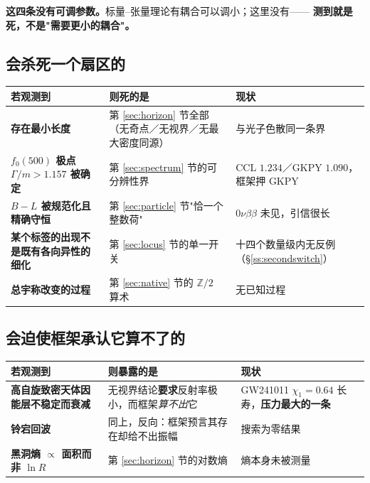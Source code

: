 \documentclass[11pt,a4paper]{article}
\theoremstyle{sudef}
\begin{document}
\textbf{这四条没有可调参数。}标量--张量理论有耦合可以调小；这里没有——
\textbf{测到就是死，不是"需要更小的耦合"。}

\subsection{会杀死一个扇区的}

\begin{center}
\begin{tabular}{p{}p{}p{}}
\toprule
若观测到 & 则死的是 & 现状 \\
\midrule
\textbf{存在最小长度} & 第 \ref{sec:horizon} 节全部（无奇点／无视界／无最大密度同源） & 与光子色散同一条界 \\
\textbf{$f_0(500)$ 极点 $\Gamma/m>1.157$ 被确定} & 第 \ref{sec:spectrum} 节的可分辨性界 & CCL $1.234$／GKPY $1.090$，框架押 GKPY \\
\textbf{$B-L$ 被规范化且精确守恒} & 第 \ref{sec:particle} 节"恰一个整数荷" & $0\nu\beta\beta$ 未见，引信很长 \\
\textbf{某个标签的出现不是既有各向异性的细化} & 第 \ref{sec:locus} 节的单一开关 & 十四个数量级内无反例（\S\ref{ss:secondswitch}）\\
\textbf{总宇称改变的过程} & 第 \ref{sec:native} 节的 $\mathbb Z/2$ 算术 & 无已知过程 \\
\bottomrule
\end{tabular}
\end{center}

\subsection{会迫使框架承认它算不了的}

\begin{center}
\begin{tabular}{p{}p{}p{}}
\toprule
若观测到 & 则暴露的是 & 现状 \\
\midrule
\textbf{高自旋致密天体因能层不稳定而衰减} & 无视界结论\textbf{要求}反射率极小，而框架\emph{算不出}它 & GW241011 $\chi_1=0.64$ 长寿，\textbf{压力最大的一条} \\
\textbf{铃宕回波} & 同上，反向：框架预言其存在却给不出振幅 & 搜索为零结果 \\
\textbf{黑洞熵 $\propto$ 面积而非 $\ln R$} & 第 \ref{sec:horizon} 节的对数熵 & 熵本身未被测量 \\
\bottomrule
\end{tabular}
\end{center}
\end{document}
